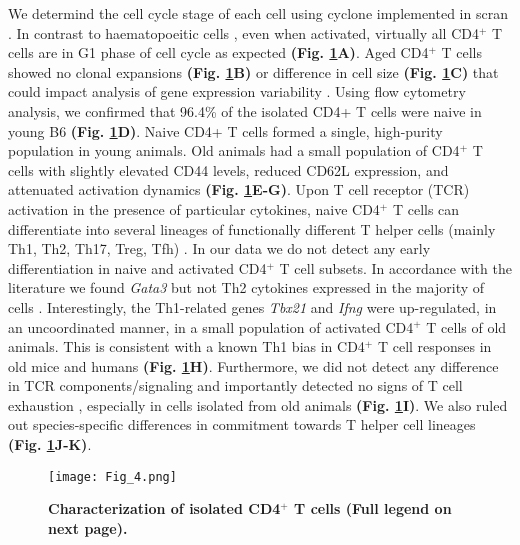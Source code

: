We determind the cell cycle stage of each cell using cyclone \citep{Scialdone2015} implemented in scran \citep{Lun2016}.
In contrast to haematopoeitic cells \citep{Kowalczyk2015}, even when activated, virtually all CD4$^+$ T cells are in G1 phase of cell cycle as expected \textbf{(Fig. \ref{fig1:characterization}A)}. Aged CD4$^+$ T cells showed no clonal expansions \textbf{(Fig. \ref{fig1:characterization}B)} or difference in cell size \textbf{(Fig. \ref{fig1:characterization}C)} that could impact analysis of gene expression variability \citep{Stubbington2015}. Using flow cytometry analysis, we confirmed that 96.4\% of the isolated CD4+ T cells were naive in young B6 \textbf{(Fig. \ref{fig1:characterization}D)}. Naive CD4+ T cells formed a single, high-purity population in young animals. Old animals had a small population of CD4$^+$ T cells with slightly elevated CD44 levels, reduced CD62L expression, and attenuated activation dynamics \textbf{(Fig. \ref{fig1:characterization}E-G)}. Upon T cell receptor (TCR) activation in the presence of particular cytokines, naive CD4$^+$ T cells can differentiate into several lineages of functionally different T helper cells (mainly Th1, Th2, Th17, Treg, Tfh) \citep{Stubbington2015, Zhu2010}. In our data we do not detect any early differentiation in naive and activated CD4$^+$ T cell subsets. In accordance with the literature we found \textit{Gata3} but not Th2 cytokines expressed in the majority of cells  \citep{Ho2009}. Interestingly, the Th1-related genes \textit{Tbx21} and \textit{Ifng} were up-regulated, in an uncoordinated manner, in a small population of activated CD4$^+$ T cells of old animals. This is consistent with a known Th1 bias in CD4$^+$ T cell responses in old mice \citep{Zhang2014} and humans \citep{Sakata-Kaneko2000} \textbf{(Fig. \ref{fig1:characterization}H)}. Furthermore, we did not detect any difference in TCR components/signaling and importantly detected no signs of T cell exhaustion \citep{Wherry2011}, especially in cells isolated from old animals \textbf{(Fig. \ref{fig1:characterization}I)}. We also ruled out species-specific differences in commitment towards T helper cell lineages \textbf{(Fig. \ref{fig1:characterization}J-K)}. \\

\begin{figure}[!hb]
\centering
\texttt{[image: Fig\_4.png]}
\caption[Characterization of isolated CD4$^+$ T cells]{\textbf{Characterization of isolated CD4$^+$ T cells (Full legend on next page).}}
\label{fig1:characterization}
\end{figure}

